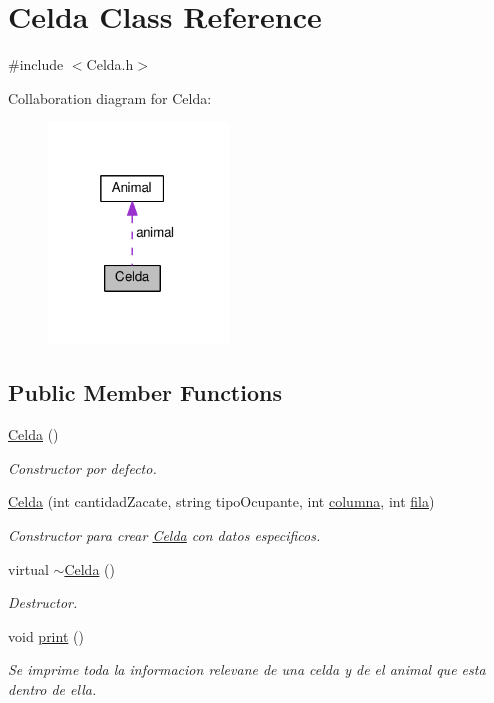 \hypertarget{classCelda}{}\section{Celda Class Reference}
\label{classCelda}


{\ttfamily \#include $<$Celda.\+h$>$}



Collaboration diagram for Celda\+:
\nopagebreak
\begin{figure}[H]
\begin{center}
\leavevmode
\includegraphics[width=136pt]{classCelda__coll__graph}
\end{center}
\end{figure}
\subsection*{Public Member Functions}
\begin{DoxyCompactItemize}
\item 
\hyperlink{classCelda_af1dadd95735043294599490d4abc6dc1}{Celda} ()
\begin{DoxyCompactList}\small\item\em Constructor por defecto. \end{DoxyCompactList}\item 
\hyperlink{classCelda_a03a6dc5cb3f51bc24efcc8d00e797d32}{Celda} (int cantidad\+Zacate, string tipo\+Ocupante, int \hyperlink{classCelda_a5f93fabd067087b5679e6226c7eb4313}{columna}, int \hyperlink{classCelda_a58bd35cc52cc550b75a33cdaccdd014b}{fila})
\begin{DoxyCompactList}\small\item\em Constructor para crear \hyperlink{classCelda}{Celda} con datos especificos. \end{DoxyCompactList}\item 
virtual \hyperlink{classCelda_a256de3b5c647bbbe404e4b40aca0d0f2}{$\sim$\+Celda} ()
\begin{DoxyCompactList}\small\item\em Destructor. \end{DoxyCompactList}\item 
void \hyperlink{classCelda_a915164163bf22fd3277d7791074d8bbe}{print} ()
\begin{DoxyCompactList}\small\item\em Se imprime toda la informacion relevane de una celda y de el animal que esta dentro de ella. \end{DoxyCompactList}\end{DoxyCompactItemize}
